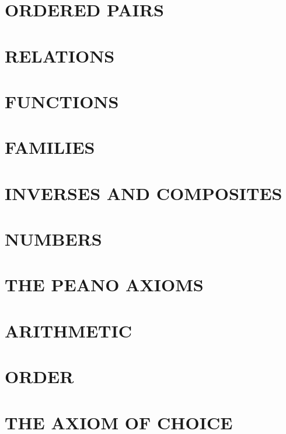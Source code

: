 \documentclass[11pt]{book}
\theoremstyle{axiom}
\theoremstyle{exc}
\begin{document}
\chapter{ORDERED PAIRS}


\chapter{RELATIONS}


\chapter{FUNCTIONS}


\chapter{FAMILIES}


\chapter{INVERSES AND COMPOSITES}


\chapter{NUMBERS}


\chapter{THE PEANO AXIOMS}


\chapter{ARITHMETIC}


\chapter{ORDER}


\chapter{THE AXIOM OF CHOICE}

\end{document}
